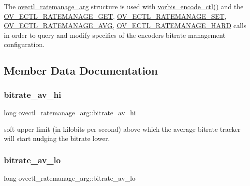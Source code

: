 The \hyperlink{structovectl__ratemanage__arg}{ovectl\+\_\+ratemanage\+\_\+arg} structure is used with \hyperlink{vorbisenc_8h_a5f398a378e20b8ce5e3341a582e773bd}{vorbis\+\_\+encode\+\_\+ctl()} and the \hyperlink{vorbisenc_8h_a614481c0d84bdfbb80eed9208b68f779}{O\+V\+\_\+\+E\+C\+T\+L\+\_\+\+R\+A\+T\+E\+M\+A\+N\+A\+G\+E\+\_\+\+G\+ET}, \hyperlink{vorbisenc_8h_a1daa1fd8ce1064cce01dde3ad447d389}{O\+V\+\_\+\+E\+C\+T\+L\+\_\+\+R\+A\+T\+E\+M\+A\+N\+A\+G\+E\+\_\+\+S\+ET}, \hyperlink{vorbisenc_8h_a34c3170d227b6368041e59c1dc7ed6e4}{O\+V\+\_\+\+E\+C\+T\+L\+\_\+\+R\+A\+T\+E\+M\+A\+N\+A\+G\+E\+\_\+\+A\+VG}, \hyperlink{vorbisenc_8h_af8869980a805f431af57a50dffbf5d33}{O\+V\+\_\+\+E\+C\+T\+L\+\_\+\+R\+A\+T\+E\+M\+A\+N\+A\+G\+E\+\_\+\+H\+A\+RD} calls in order to query and modify specifics of the encoder\textquotesingle{}s bitrate management configuration. 

\subsection{Member Data Documentation}
\mbox{\label{structovectl__ratemanage__arg_ac1e81b5a2e705022ca895f494718ded7}} 
\subsubsection{\texorpdfstring{bitrate\+\_\+av\+\_\+hi}{bitrate\_av\_hi}}
{\footnotesize\ttfamily long ovectl\+\_\+ratemanage\+\_\+arg\+::bitrate\+\_\+av\+\_\+hi}

soft upper limit (in kilobits per second) above which the average bitrate tracker will start nudging the bitrate lower. \mbox{\label{structovectl__ratemanage__arg_ac241670a3a608f114acaf8f26fe4e913}} 
\subsubsection{\texorpdfstring{bitrate\+\_\+av\+\_\+lo}{bitrate\_av\_lo}}
{\footnotesize\ttfamily long ovectl\+\_\+ratemanage\+\_\+arg\+::bitrate\+\_\+av\+\_\+lo}

